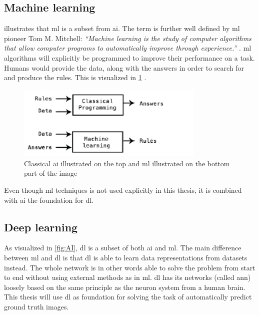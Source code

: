 \documentclass[USenglish]{ifimaster}  %
\begin{document}
\subsection{Machine learning}
 illustrates that \ac{ml} is a subset from \ac{ai}. The term is further well defined by \ac{ml} pioneer Tom M. Mitchell:
\newline
\newline
\textit{“Machine learning is the study of computer algorithms that allow computer programs to automatically improve through experience.”} \cite{tom_mitchell}.
\newline
\newline
\ac{ml} algorithms will explicitly be programmed to improve their performance on a task. Humans would provide the data, along with the answers in order to search for and produce the rules. This is visualized in \cref{fig:ml} \cite{Francois_Deep_learning_with_python}.
\begin{figure}[H]
    \centering
    \includegraphics[width=0.8\textwidth]{bilder/ml.png}
    \caption{Classical \ac{ai} illustrated on the top and \ac{ml} illustrated on the bottom part of the image \cite{Francois_Deep_learning_with_python}}
    \label{fig:ml}
\end{figure}

Even though \ac{ml} techniques is not used explicitly in this thesis, it is combined with \ac{ai} the foundation for \ac{dl}.

\subsection{Deep learning}
As visualized in \cref{fig:AI}, \ac{dl} is a subset of both \ac{ai} and \ac{ml}. The main difference between \ac{ml} and \ac{dl} is that \ac{dl} is able to learn data representations from datasets instead. The whole network is in other words able to solve the problem from start to end without using external methods as in \ac{ml}. \ac{dl} has its networks (called \ac{ann}) loosely based on the same principle as the neuron system from a human brain. This thesis will use \ac{dl} as foundation for solving the task of automatically predict ground truth images. 
\end{document}
